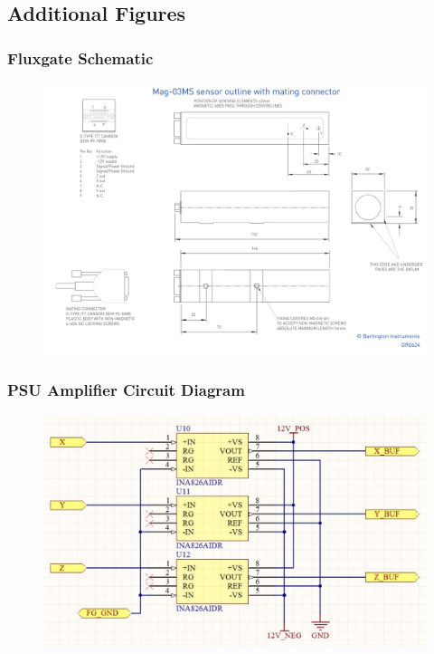 \documentclass{TheMartianReport}
\begin{document}
\subsection{Additional Figures}
\subsubsection{Fluxgate Schematic}
\begin{figure}[h]
	\centering
	\includegraphics[angle=-90,origin=c,scale=0.6]{Mag-03_Drawing}
	\caption{}
	\label{fig:FGschematic}
\end{figure}

\pagebreak

\subsubsection{PSU Amplifier Circuit Diagram}
\begin{figure}[h]
	\centering
	\includegraphics[scale=0.5]{PSU_amp_diagram}
	\caption{}
	\label{fig:PSUamp}
\end{figure}
\end{document}
